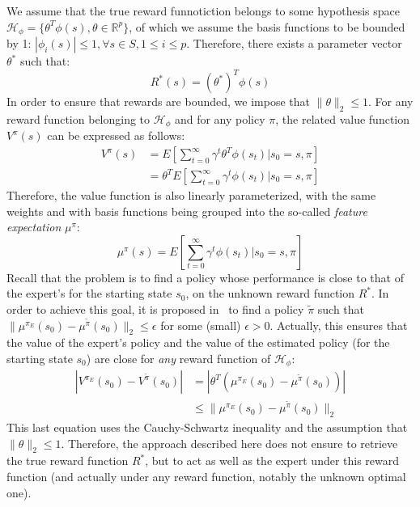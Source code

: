 \documentclass{jfpda2011}
\begin{document}
We assume that the true reward funnotiction belongs to some hypothesis
space $\mathcal{H}_\phi = \{\theta^T \phi(s),
\theta\in\mathbb{R}^p\}$, of which we assume the basis functions to
be bounded by 1: $|\phi_i(s)|\leq 1, \forall s\in S, 1\leq i \leq
p$. Therefore, there exists a parameter vector $\theta^*$ such that:
\begin{equation}
  R^*(s) = (\theta^*)^T \phi(s)
\end{equation}
In order to ensure that rewards are bounded, we impose that
$\|\theta\|_2\leq 1$. For any reward function belonging to
$\mathcal{H}_\phi$ and for any policy $\pi$, the related value
function $V^\pi(s)$ can be expressed as follows:
\begin{align}
  V^\pi(s) &= E[\sum_{t=0}^\infty \gamma^t \theta^T \phi(s_t)|s_0=s, \pi]
  \\
  &= \theta^T  E[\sum_{t=0}^\infty \gamma^t \phi(s_t)|s_0=s, \pi]
\end{align}
Therefore, the value function is also linearly parameterized, with
the same weights and with basis functions being grouped into the
so-called \emph{feature expectation} $\mu^\pi$:
\begin{equation}
  \mu^\pi(s) = E[\sum_{t=0}^\infty \gamma^t \phi(s_t)|s_0=s, \pi]
\end{equation}
Recall that the problem is to find a policy whose performance is
close to that of the expert's for the starting state $s_0$, on the
unknown reward function $R^*$. In order to achieve this goal, it is
proposed in~\citep{abbeel2004apprenticeship} to find a policy $\tilde{\pi}$ such
that $\|\mu^{\pi_E}(s_0)-\mu^{\tilde{\pi}}(s_0)\|_2\leq \epsilon$
for some (small) $\epsilon>0$. Actually, this ensures that the value
of the expert's policy and the value of the estimated policy (for
the starting state $s_0$) are close for \emph{any} reward function
of $\mathcal{H}_\phi$:
\begin{align}
  |V^{\pi_E}(s_0) - V^{\tilde{\pi}}(s_0)| &=
  |\theta^T(\mu^{\pi_E}(s_0)-\mu^{\tilde{\pi}}(s_0))|
  \label{eqn:vs0}
  \\
  &\leq \|\mu^{\pi_E}(s_0)-\mu^{\tilde{\pi}}(s_0)\|_2
\end{align}
This last equation uses the Cauchy-Schwartz inequality and the
assumption that $\|\theta\|_2\leq 1$. Therefore, the approach
described here does not ensure to retrieve the true reward function
$R^*$, but to act as well as the expert under this reward function
(and actually under any reward function, notably the unknown optimal
one).
\end{document}
